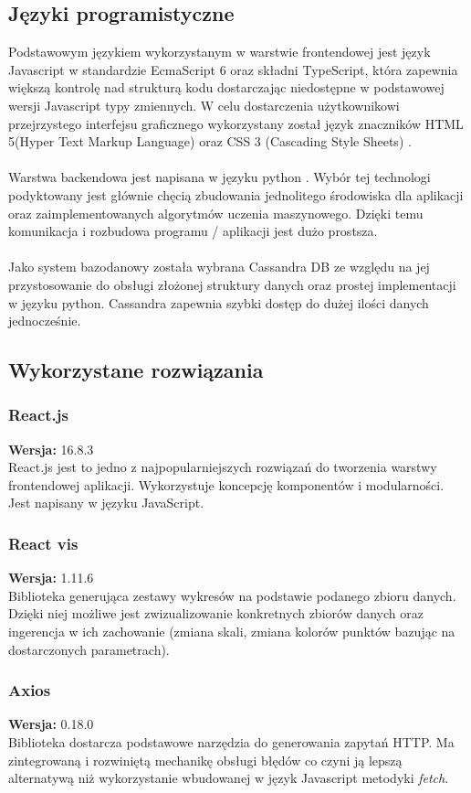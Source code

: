 \documentclass[eng,printmode]{mgr}
\begin{document}
\subsection{Języki programistyczne}
Podstawowym językiem wykorzystanym w warstwie frontendowej jest język Javascript \cite{js} w standardzie EcmaScript 6 \cite{es6} oraz składni TypeScript\cite{ts}, która zapewnia większą kontrolę nad strukturą kodu dostarczając niedostępne w podstawowej wersji Javascript typy zmiennych. W celu dostarczenia użytkownikowi przejrzystego interfejsu graficznego wykorzystany został język znaczników HTML 5(Hyper Text Markup Language)\cite{html} oraz CSS 3 (Cascading Style Sheets) \cite{css}.
\\\\
Warstwa backendowa jest napisana w języku python \cite{python}. Wybór tej technologi podyktowany jest głównie chęcią zbudowania jednolitego środowiska dla aplikacji oraz zaimplementowanych algorytmów uczenia maszynowego. Dzięki temu komunikacja i rozbudowa programu / aplikacji jest dużo prostsza.
\\\\
Jako system bazodanowy została wybrana Cassandra DB \cite{cassandra} ze względu na jej przystosowanie do obsługi złożonej struktury danych oraz prostej implementacji w języku python. Cassandra zapewnia szybki dostęp do dużej ilości danych jednocześnie.
\subsection{Wykorzystane rozwiązania}
\subsubsection{React.js}
\small \textbf{Wersja:} 16.8.3\\
React.js \cite{react} jest to jedno z najpopularniejszych rozwiązań do tworzenia warstwy frontendowej aplikacji. Wykorzystuje koncepcję komponentów i modularności. Jest napisany w języku JavaScript.
\subsubsection{React vis}
\small \textbf{Wersja:} 1.11.6\\
Biblioteka generująca zestawy wykresów na podstawie podanego zbioru danych. Dzięki niej możliwe jest zwizualizowanie konkretnych zbiorów danych oraz ingerencja w ich zachowanie (zmiana skali, zmiana kolorów punktów bazując na dostarczonych parametrach).
\subsubsection{Axios}
\small \textbf{Wersja:} 0.18.0\\
Biblioteka dostarcza podstawowe narzędzia do generowania zapytań HTTP. Ma zintegrowaną i rozwiniętą mechanikę obsługi błędów co czyni ją lepszą alternatywą niż wykorzystanie wbudowanej  w język Javascript metodyki \textit{fetch}.
\end{document}
